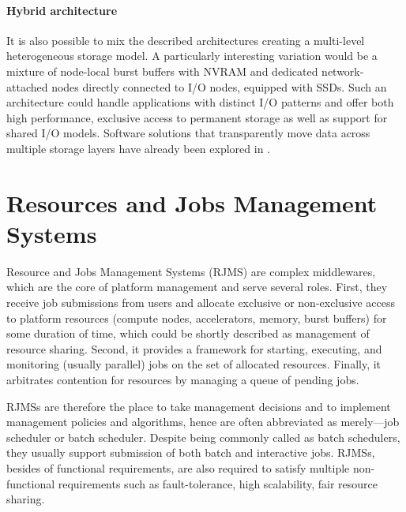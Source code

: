 \documentclass[thesis-en.tex]{subfiles}
\begin{document}

\paragraph{Hybrid architecture}
It is also possible to mix the described architectures creating a multi-level heterogeneous storage model. A particularly interesting variation would be a mixture of node-local burst buffers with NVRAM and dedicated network-attached nodes directly connected to I/O nodes, equipped with SSDs. Such an architecture could handle applications with distinct I/O patterns and offer both high performance, exclusive access to permanent storage as well as support for shared I/O models. Software solutions that transparently move data across multiple storage layers have already been explored in \cite{8514867,8411015,10.1145/3208040.3208059}.

\section{Resources and Jobs Management Systems} \label{sec:rjms}
Resource and Jobs Management Systems (RJMS) are complex middlewares, which are the core of platform management and serve several roles. First, they receive job submissions from users and allocate exclusive or non-exclusive access to platform resources (compute nodes, accelerators, memory, burst buffers) for some duration of time, which could be shortly described as management of resource sharing. Second, it provides a framework for starting, executing, and monitoring (usually parallel) jobs on the set of allocated resources. Finally, it arbitrates contention for resources by managing a queue of pending jobs.

RJMSs are therefore the place to take management decisions and to implement management policies and algorithms, hence are often abbreviated as merely---job scheduler or batch scheduler. Despite being commonly called as batch schedulers, they usually support submission of both batch and interactive jobs. RJMSs, besides of functional requirements, are also required to satisfy multiple non-functional requirements such as fault-tolerance, high scalability, fair resource sharing.
\end{document}
